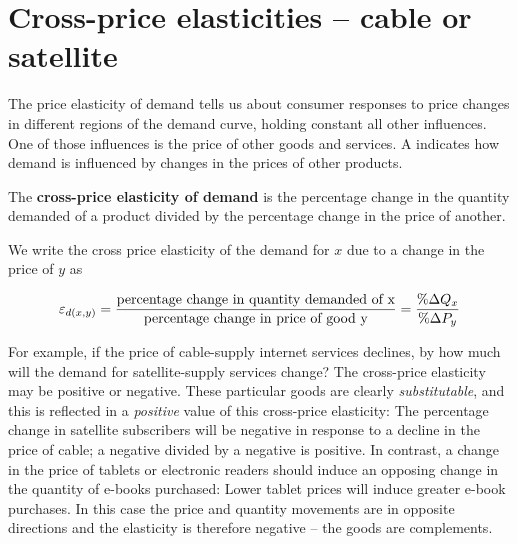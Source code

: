 \section{Cross-price elasticities -- cable or satellite}\label{sec:ch4sec4}

The price elasticity of demand tells us about consumer responses to price
changes in different regions of the demand curve, holding constant all other
influences. One of those influences is the price of other goods and
services. A  indicates how demand is
influenced by changes in the prices of other products.

\begin{DefBox}
The \textbf{cross-price elasticity of demand} is the percentage change in the quantity demanded of a product divided by the percentage change in the price of another.
\end{DefBox}

We write the cross price elasticity of the demand for $x$ due to a change in
the price of $y$ as

\begin{equation*}
\varepsilon_{d(x,y)}=\frac{\text{percentage change in quantity demanded of x%
}}{\text{percentage change in price of good y}}=\frac{\%\Delta Q_{x}}{%
\%\Delta P_{y}} 
\end{equation*}

For example, if the price of cable-supply internet services declines, by how
much will the demand for satellite-supply services change? The cross-price
elasticity may be positive or negative. These particular goods are clearly 
\textit{substitutable}, and this is reflected in a \textit{positive} value
of this cross-price elasticity: The percentage change in satellite
subscribers will be negative in response to a decline in the price of cable;
a negative divided by a negative is positive. In contrast, a change in the
price of tablets or electronic readers should induce an opposing change in
the quantity of e-books purchased: Lower tablet prices will induce greater
e-book purchases. In this case the price and quantity movements are in
opposite directions and the elasticity is therefore negative -- the goods are
complements.